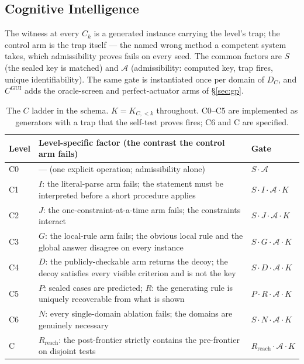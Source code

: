 \subsection{Cognitive Intelligence}
The witness at every $C_k$ is a generated instance carrying the level's trap; the control arm is the trap itself --- the named wrong method a competent system takes, which admissibility proves fails on every seed. The common factors are $S$ (the sealed key is matched) and $\mathcal A$ (admissibility: computed key, trap fires, unique identifiability). The same gate is instantiated once per domain of $D_C$, and $C^{\mathrm{GUI}}$ adds the oracle-screen and perfect-actuator arms of \S\ref{sec:gp}.
\begin{table}[!htbp]
\centering\small
\begin{tabularx}{\textwidth}{@{}lYl@{}}
\toprule
Level & Level-specific factor (the contrast the control arm fails) & Gate \\
\midrule
C0 & --- (one explicit operation; admissibility alone) & $S\cdot\mathcal A$ \\
C1 & $I$: the literal-parse arm fails; the statement must be interpreted before a short procedure applies & $S\cdot I\cdot\mathcal A\cdot K$ \\
C2 & $J$: the one-constraint-at-a-time arm fails; the constraints interact & $S\cdot J\cdot\mathcal A\cdot K$ \\
C3 & $G$: the local-rule arm fails; the obvious local rule and the global answer disagree on every instance & $S\cdot G\cdot\mathcal A\cdot K$ \\
C4 & $D$: the publicly-checkable arm returns the decoy; the decoy satisfies every visible criterion and is not the key & $S\cdot D\cdot\mathcal A\cdot K$ \\
C5 & $P$: sealed cases are predicted; $R$: the generating rule is uniquely recoverable from what is shown & $P\cdot R\cdot\mathcal A\cdot K$ \\
C6 & $N$: every single-domain ablation fails; the domains are genuinely necessary & $S\cdot N\cdot\mathcal A\cdot K$ \\
C\Om{} & $R_{\mathrm{reach}}$: the post-frontier strictly contains the pre-frontier on disjoint tests & $R_{\mathrm{reach}}\cdot\mathcal A\cdot K$ \\
\bottomrule
\end{tabularx}
\caption{The $C$ ladder in the schema. $K = K_{C,<k}$ throughout. C0--C5 are implemented as generators with a trap that the self-test proves fires; C6 and C\Om{} are specified.}
\label{tab:cstyle}
\end{table}

